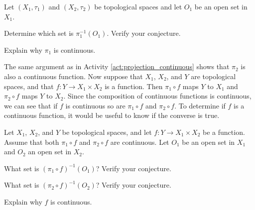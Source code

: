 \begin{activity} \label{act:projection_continuous} Let $(X_1, \tau_1)$ and $(X_2, \tau_2)$ be topological spaces and let $O_1$ be an open set in $X_1$. 
\ba
\item Determine which set is $\pi_1^{-1}(O_1)$. Verify your conjecture.

\item Explain why $\pi_1$ is continuous.

\ea

\end{activity}

\begin{comment}

\ActivitySolution

\ba
\item We will demonstrate that $\pi_1^{-1}(O_1) = O_1 \times X_2$. Let $(s,t) \in \pi_1^{-1}(O_1)$. Then $\pi_1((s,t)) = s \in O_1$. So $(s,t) \in O_1 \times X_2$ and $\pi_1^{-1}(O_1) \subseteq O_1 \times X_2$. Now let $(s,t) \in O_1 \times X_2$. Then $\pi_1((s,t)) = s \in O_1$ and $(s,t) \in \pi_1^{-1}(O_1)$. 

\item Recall that the sets $O_1 \times O_2$ with $O_1 \in \tau_1$ and $O_2 \in \tau_2$ form a basis for the product topology. Part (a) shows that the inverse image of an open set in $X_1$ under $\pi_1$ is open in $X_1 \times X_2$, so we conclude that $\pi_1$ is a continuous function.

\ea

\end{comment}

The same argument as in Activity \ref{act:projection_continuous} shows that $\pi_2$ is also a continuous function. Now suppose that $X_1$, $X_2$, and $Y$ are topological spaces, and that $f: Y \to X_1 \times X_2$ is a function. Then $\pi_1 \circ f$ maps $Y$ to $X_1$ and $\pi_2 \circ f$ maps $Y$ to $X_2$. Since the composition of continuous functions is continuous, we can see that if $f$ is continuous so are $\pi_1\circ f$ and $\pi_2 \circ f$. To determine if $f$ is a continuous function, it would be useful to know if the converse is true.

\begin{activity} Let $X_1$, $X_2$, and $Y$ be topological spaces, and let $f: Y \to X_1 \times X_2$ be a function.  Assume that both $\pi_1\circ f$ and $\pi_2 \circ f$ are continuous. Let $O_1$ be an open set in $X_1$ and $O_2$ an open set in $X_2$. 
\ba
\item What set is $(\pi_1\circ f)^{-1}(O_1)$? Verify your conjecture.

\item What set is $(\pi_2\circ f)^{-1}(O_2)$? Verify your conjecture.

\item Explain why $f$ is continuous.


\ea

\end{activity}

